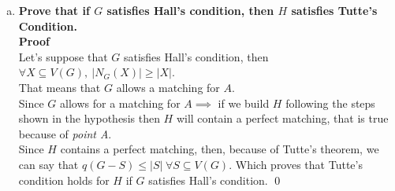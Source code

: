 \begin{enumerate}[a)]
    \linebreak 
    As all vertices in $A$ are matched, and now all unmatched vertices in $B'$ are matched, we have created a perfect matching. Thus, we have contradicted the hypothesis that $H$ does not contain a perfect matching. \\
    \linebreak 
    To conclude, if $G$ contains a matching of $A$, then the graph $H$ built from $G$ as described in the statement contains a perfect matching. \qed\\
    \linebreak
    \boldmath
    \textbf{(Proof $\impliedby$)} \unboldmath If $H$ has a perfect matching $\implies G$ has a matching of $A$\\
    Since $H$ was built starting from $G$ by adding edges to link the vertices in $B'$ and $E(G)$ is preserved throughout the process then $G$ must contain already a matching for $A$, because, if it did not, adding edges to turn the subgraph based on $B'$ into a complete subgraph would not produce any relevant change for the vertices in $A$.\\
    \linebreak
    In fact, if we call $x \in A$ a vertex inside $A$, the only way for it to be matched in $H$ is that there is a $y \in B \implies y \in B' \st xy \in E(G)$. Since $H$ does only modify $E(B')$ if the edge $xy \notin E(G)$ it will not be in $E(H)$ and thus $A$ will not be matched in $H$ either. \qed
    \boldmath
    \item \textbf{Prove that if $G$ satisfies Hall’s condition, then $H$ satisfies Tutte’s Condition.}
    \unboldmath\\
    \linebreak
    \textbf{Proof}\\
    Let's suppose that $G$ satisfies Hall's condition, then $\forall X \subseteq V(G), \: |N_G(X)| \geq |X|$.\\
    That means that $G$ allows a matching for $A$.\\
    \linebreak
    Since $G$ allows for a matching for $A \implies$ if we build $H$ following the steps shown in the hypothesis then $H$ will contain a perfect matching, that is true because of \textit{point A}.\\
    \linebreak
    Since $H$ contains a perfect matching, then, because of Tutte's theorem, we can say that $q(G - S) \leq |S| \hspace{3pt}\forall S \subseteq V(G)$. Which proves that Tutte's condition holds for $H$ if $G$ satisfies Hall's condition. \qed
    

\end{enumerate}
